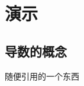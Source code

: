\documentclass[12pt, a4paper, oneside, UTF8]{ctexbook}
\begin{document}
\else
\fi

\chapter{演示}
\section{导数的概念}
随便引用的一个东西\cite{choy20194d}



\ifx\allfiles\undefined
\end{document}
